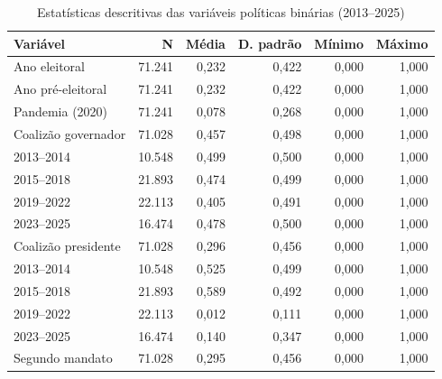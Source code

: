 \begin{table}[htbp]
\caption{Estatísticas descritivas das variáveis políticas binárias (2013--2025)}\label{tab:politicas}
\footnotesize
\setlength{\tabcolsep}{4pt}
\begin{tabular}{lrrrrr}
\hline
\textbf{Variável} & \textbf{N} & \textbf{Média} & \textbf{D. padrão} & \textbf{Mínimo} & \textbf{Máximo} \\ \hline
Ano eleitoral & 71.241 & 0,232 & 0,422 & 0,000 & 1,000 \\
Ano pré-eleitoral & 71.241 & 0,232 & 0,422 & 0,000 & 1,000 \\
Pandemia (2020) & 71.241 & 0,078 & 0,268 & 0,000 & 1,000 \\
Coalizão governador & 71.028 & 0,457 & 0,498 & 0,000 & 1,000 \\
\hspace{1em}2013--2014 & 10.548 & 0,499 & 0,500 & 0,000 & 1,000 \\
\hspace{1em}2015--2018 & 21.893 & 0,474 & 0,499 & 0,000 & 1,000 \\
\hspace{1em}2019--2022 & 22.113 & 0,405 & 0,491 & 0,000 & 1,000 \\
\hspace{1em}2023--2025 & 16.474 & 0,478 & 0,500 & 0,000 & 1,000 \\
Coalizão presidente & 71.028 & 0,296 & 0,456 & 0,000 & 1,000 \\
\hspace{1em}2013--2014 & 10.548 & 0,525 & 0,499 & 0,000 & 1,000 \\
\hspace{1em}2015--2018 & 21.893 & 0,589 & 0,492 & 0,000 & 1,000 \\
\hspace{1em}2019--2022 & 22.113 & 0,012 & 0,111 & 0,000 & 1,000 \\
\hspace{1em}2023--2025 & 16.474 & 0,140 & 0,347 & 0,000 & 1,000 \\
Segundo mandato & 71.028 & 0,295 & 0,456 & 0,000 & 1,000 \\
\hline
\end{tabular}
\end{table}
